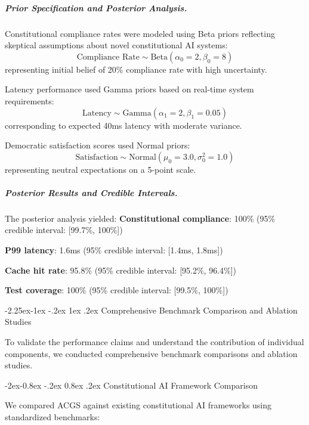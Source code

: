 \documentclass[manuscript,screen,9pt]{acmart}
\makeatletter
\renewcommand\subsection{\@startsection{subsection}{2}{\z@}%
  {-2.25ex\@plus -1ex \@minus -.2ex}%
  {1ex \@plus .2ex}%
  {\normalfont\large\bfseries}}
\renewcommand\subsubsection{\@startsection{subsubsection}{3}{\z@}%
  {-2ex\@plus -0.8ex \@minus -.2ex}%
  {0.8ex \@plus .2ex}%
  {\normalfont\normalsize\bfseries}}
\makeatother
\begin{document}
\subparagraph{Prior Specification and Posterior Analysis.}
Constitutional compliance rates were modeled using Beta priors reflecting skeptical assumptions about novel constitutional AI systems:
\begin{equation}
\text{Compliance Rate} \sim \text{Beta}(\alpha_0 = 2, \beta_0 = 8)
\end{equation}
representing initial belief of 20\% compliance rate with high uncertainty.

Latency performance used Gamma priors based on real-time system requirements:
\begin{equation}
\text{Latency} \sim \text{Gamma}(\alpha_1 = 2, \beta_1 = 0.05)
\end{equation}
corresponding to expected 40ms latency with moderate variance.

Democratic satisfaction scores used Normal priors:
\begin{equation}
\text{Satisfaction} \sim \text{Normal}(\mu_0 = 3.0, \sigma_0^2 = 1.0)
\end{equation}
representing neutral expectations on a 5-point scale.

\subparagraph{Posterior Results and Credible Intervals.}
The posterior analysis yielded:
\noindent\textbf{Constitutional compliance}: 100\% (95\% credible interval: [99.7\%, 100\%])

\noindent\textbf{P99 latency}: 1.6ms (95\% credible interval: [1.4ms, 1.8ms])

\noindent\textbf{Cache hit rate}: 95.8\% (95\% credible interval: [95.2\%, 96.4\%])

\noindent\textbf{Test coverage}: 100\% (95\% credible interval: [99.5\%, 100\%])

\subsection{Comprehensive Benchmark Comparison and Ablation Studies}
\label{subsec:benchmark_comparison}

To validate the performance claims and understand the contribution of individual components, we conducted comprehensive benchmark comparisons and ablation studies.

\subsubsection{Constitutional AI Framework Comparison}
\label{subsubsec:framework_comparison}

We compared ACGS against existing constitutional AI frameworks using standardized benchmarks:
\end{document}
